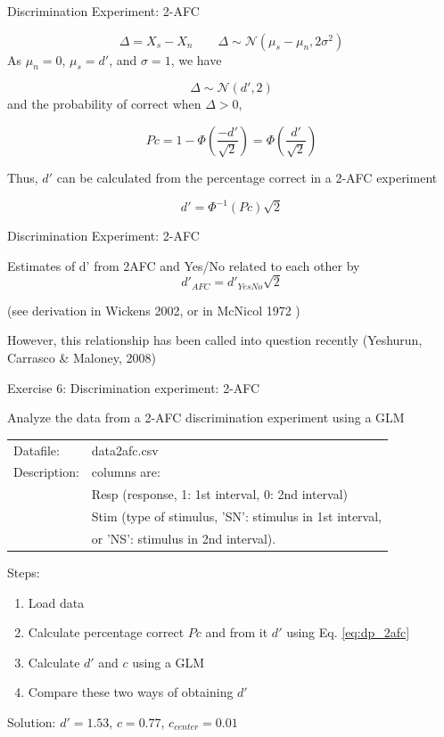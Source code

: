 \documentclass[10pt]{beamer}
\begin{document}
\begin{frame}{Discrimination Experiment: 2-AFC}

$$
\Delta = X_s - X_n \quad \quad \Delta \sim \mathcal{N} (\mu_s - \mu_n, 2\sigma^2)
$$
As $\mu_n=0$, $\mu_s=d'$, and $\sigma=1$, we have

$$
\Delta \sim \mathcal{N} (d', 2)
$$
and the probability of correct  when $\Delta > 0$,

$$Pc = 1 -\Phi\left(\frac{-d'}{\sqrt{2}}\right) = \Phi\left(\frac{d'}{\sqrt{2}} \right)
$$

Thus, $d'$ can be calculated from the percentage correct in a 2-AFC experiment

\begin{equation}
\label{eq:dp_2afc}
d' = \Phi^{-1}(Pc) \sqrt{2}
\end{equation}

\end{frame}

\begin{frame}{Discrimination Experiment: 2-AFC}

Estimates of d' from 2AFC and Yes/No related to each other by 
$$
d'_{AFC} =  d'_{YesNo} \sqrt{2}
$$ 

(see derivation in Wickens 2002,  or in McNicol 1972 )\\
\vspace{10pt}

However, this relationship has been called into question recently (Yeshurun, Carrasco \& Maloney, 2008)
\end{frame}




\begin{frame}[fragile]{Exercise 6: Discrimination experiment: 2-AFC}

Analyze the data from a 2-AFC discrimination experiment using a GLM

\begin{tabular}{ll}
Datafile: & data2afc.csv\\
Description: & columns are: \\
& Resp (response, 1: 1st interval, 0: 2nd interval)\\
& Stim (type of stimulus, 'SN': stimulus in 1st interval, \\
& or 'NS': stimulus in 2nd interval).
\end{tabular}

\vspace{10pt}


Steps:
\begin{enumerate}
\item Load data
\item Calculate percentage correct $Pc$ and from it $d'$ using Eq. \autoref{eq:dp_2afc}
\item Calculate $d'$ and $c$ using a GLM
\item Compare these two ways of obtaining $d'$
\end{enumerate}

\pause
\begin{center}
Solution: $d' = 1.53$, $c=0.77$, $c_{center} = 0.01$
\end{center}
\end{frame}
\end{document}
